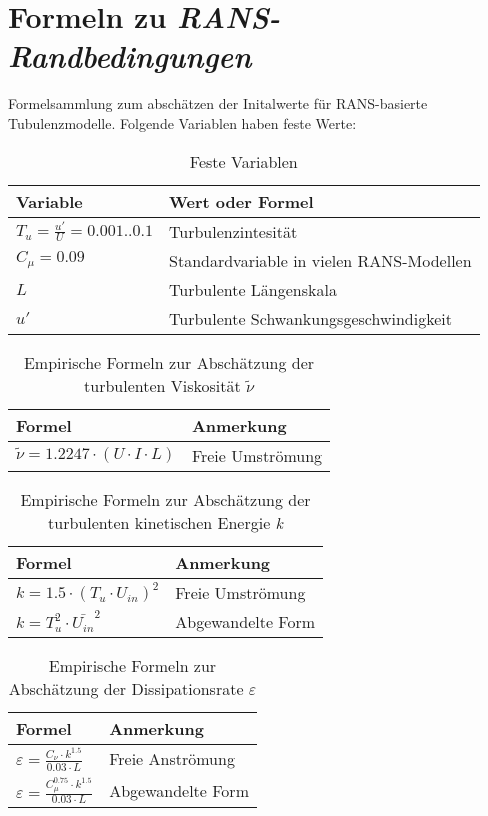 \chapter{Formeln zu \textit{RANS-Randbedingungen}}

Formelsammlung zum abschätzen der Initalwerte für RANS-basierte Tubulenzmodelle.
Folgende Variablen haben feste Werte:

\begin{table}
  \centering
  \caption{Feste Variablen}
  \begin{tabular}{m{4cm}m{8cm}}
    \toprule
    	Variable & Wert oder Formel \\
    \midrule
    	 $ T_{u} = \frac{u'}{U} = 0.001 .. 0.1 $ & Turbulenzintesität \\
		 $ C_{\mu} = 0.09 $ & Standardvariable in vielen RANS-Modellen \\
		 $ L $ & Turbulente Längenskala \\
		 $ u' $ & Turbulente Schwankungsgeschwindigkeit	\\	 
    \bottomrule
  \end{tabular}
\end{table}

\begin{table}
  \centering
  \caption{Empirische Formeln zur Abschätzung der turbulenten Viskosität \textit{ $ \tilde{ \nu } $ } }
  \begin{tabular}{m{4cm}m{8cm}}
    \toprule
    	Formel & Anmerkung \\
    \midrule
    	 $ \tilde{\nu} = 1.2247 \cdot ( U \cdot I \cdot L ) $ & Freie Umströmung \\
    \bottomrule
  \end{tabular}
\end{table}

\begin{table}
  \centering
  \caption{Empirische Formeln zur Abschätzung der turbulenten kinetischen Energie \textit{k}}
  \begin{tabular}{m{4cm}m{8cm}}
    \toprule
    	Formel & Anmerkung \\
    \midrule
    	 $ k = 1.5 \cdot (T_{u} \cdot U_{in})^{2} $ & Freie Umströmung \\
		 $ k = T_{u}^{2} \cdot \bar{U_{in}}^{2}$ & Abgewandelte Form \\		 
    \bottomrule
  \end{tabular}
\end{table}

\begin{table}
  \centering
  \caption{Empirische Formeln zur Abschätzung der Dissipationsrate \textit{$ \varepsilon $}}
  \begin{tabular}{m{4cm}m{8cm}}
    \toprule
    	Formel & Anmerkung \\
    \midrule
    	 $ \varepsilon = \frac{ C_{\nu} \cdot k^{1.5}}{0.03 \cdot L} $ & Freie Anströmung \\
		 $ \varepsilon = \frac{ C_{\mu}^{0.75} \cdot k^{1.5}}{0.03 \cdot L} $ & Abgewandelte Form \\		 
    \bottomrule
  \end{tabular}
\end{table}

